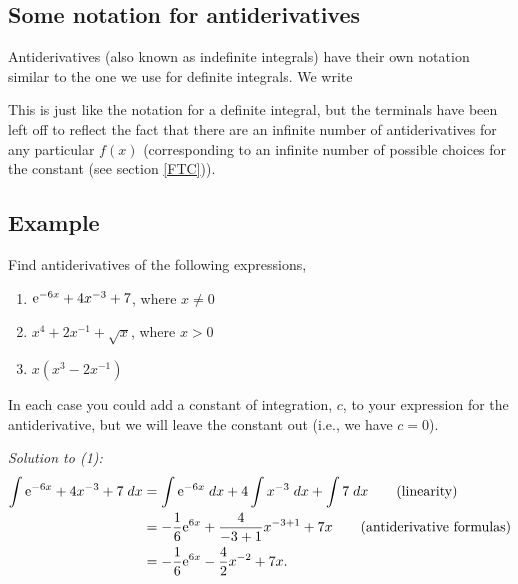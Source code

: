 \subsection{Some notation for antiderivatives} \label{symbindefiniteintegral}
Antiderivatives (also known as indefinite integrals) have their own notation similar to the one we use for definite integrals. We write

  	\bigskip
	
	\hfil{}
	\bigskip
	\bigskip

\noindent This is just like the notation for a definite integral, but the terminals have been left off to reflect the fact that there are an infinite number of antiderivatives for any particular $f(x)$ (corresponding to an infinite number of possible choices for the constant (see section \ref{FTC})).

\subsection{Example}
Find antiderivatives of the following expressions,
\begin{enumerate}
\item $\mathrm{e}^{-6x} + 4x^{-3} + 7$, \;\;\; where $x \neq 0$
\item $x^4 + 2x^{-1} + \sqrt{x}$, \;\;\; where $x > 0$
\item $x(x^3 - 2x^{-1})$
\end{enumerate}
In each case you could add a constant of integration, $c$, to your expression for the antiderivative, but we will leave the constant out (i.e., we have $c = 0$).

\noindent \textit{Solution to (1):} \\
\begin{align*}
\int \mathrm{e}^{-6x} + 4x^{-3} + 7 \; dx & =  \int \mathrm{e}^{-6x} \; dx + 4\int x^{-3} \; dx + \int 7 \; dx \tag{linearity} \\
	& = -\frac{1}{6}\mathrm{e}^{6x} + \frac{4}{-3+1}x^{-3+1} + 7x \tag{antiderivative formulas} \\
	& = -\frac{1}{6}\mathrm{e}^{6x} - \frac{4}{2}x^{-2} + 7x.
\end{align*}

